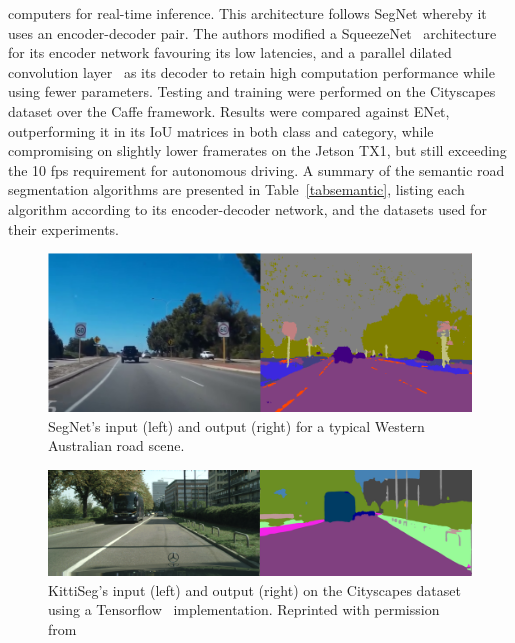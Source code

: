 computers for real-time inference. This architecture follows SegNet whereby it uses an encoder-decoder pair. The authors modified a SqueezeNet~\cite{iandola_squeezenet:_2016-1} architecture for its encoder network favouring its low latencies, and a parallel dilated convolution layer~\cite{l._c._chen_deeplab:_2017} as its decoder to retain high computation performance while using fewer parameters. Testing and training were performed on the Cityscapes dataset over the Caffe framework. Results were compared against ENet, outperforming it in its IoU matrices in both class and category, while compromising on slightly lower framerates on the Jetson TX1, but still exceeding the 10 fps requirement for autonomous driving. A summary of the semantic road segmentation algorithms are presented in Table~\ref{tabsemantic}, listing each algorithm according to its encoder-decoder network, and the datasets used for their experiments. 

\begin{figure}[H]
	\centering
	\includegraphics[width=0.8\linewidth]{segnet}
	\caption[SegNet on a Western Australian road scene]{SegNet's input (left) and output (right) for a typical Western Australian road scene.}
	\label{figsegnet}
\end{figure}

\begin{figure}[H]
	\centering
	\includegraphics[width=0.8\linewidth]{kittiseg}
	\caption[KittiSeg on the Citiscapes dataset]{KittiSeg's input (left) and output (right) on the Cityscapes dataset using a Tensorflow~\cite{abadi_tensorflow:_2016} implementation. Reprinted with permission from~\cite{palazzi_github_2017}}
	\label{figkittiseg}
\end{figure}

